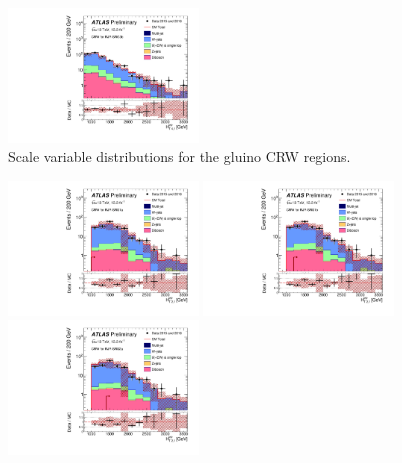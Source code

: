\begin{figure}[tbp]
\begin{center}
\includegraphics[width=0.45\textwidth]{figures/ATLAS-CONF-2016-078_INT/N-1Plots/AtlasStyle/Preliminary/CRW_SRJigsawSRG3b_LastCut_CRW_minusone}
\end{center}
\caption{Scale variable distributions for the gluino CRW regions.}
\label{fig:CRW_SRJigsawSRG1a_LastCut_CRW_minusone}
\end{figure}

\begin{figure}[tbp]
\begin{center}
\includegraphics[width=0.45\textwidth]{figures/ATLAS-CONF-2016-078_INT/N-1Plots/AtlasStyle/Preliminary/CRW_SRJigsawSRS1a_LastCut_CRW_minusone}
\includegraphics[width=0.45\textwidth]{figures/ATLAS-CONF-2016-078_INT/N-1Plots/AtlasStyle/Preliminary/CRW_SRJigsawSRS1b_LastCut_CRW_minusone}
\includegraphics[width=0.45\textwidth]{figures/ATLAS-CONF-2016-078_INT/N-1Plots/AtlasStyle/Preliminary/CRW_SRJigsawSRS2a_LastCut_CRW_minusone}

\end{center}
\end{figure}
